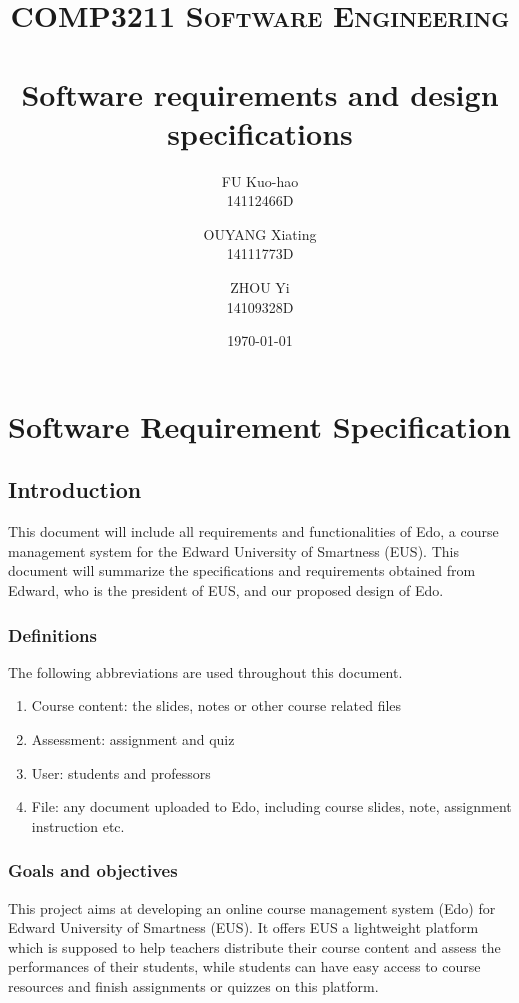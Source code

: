 \documentclass[paper=a4, fontsize=11pt]{scrartcl}
\title{
		\usefont{OT1}{bch}{b}{n}
		\normalfont \normalsize \textsc{COMP3211 Software Engineering} \\ [25pt]
		\horrule{0.5pt} \\[0.4cm]
		\huge Software requirements and design specifications
		\horrule{2pt} \\[0.5cm]
}
\author{
		\normalfont 								
        FU Kuo-hao \\
        14112466D
        \and
        OUYANG Xiating \\
        14111773D
        \and
        ZHOU Yi \\
        14109328D
}
\date{\today}
\numberwithin{equation}{section}		%
\numberwithin{figure}{section}			%
\numberwithin{table}{section}				%
\begin{document}
\begin{titlepage}
\maketitle

\end{titlepage}

\begin{titlepage}
\tableofcontents
\end{titlepage}


\section{Software Requirement Specification}

\subsection{Introduction}
This document will include all requirements and functionalities of Edo, a course management system for the Edward University of Smartness (EUS). This document will summarize the specifications and requirements obtained from Edward, who is the president of EUS, and our proposed design of Edo.

\subsubsection{Definitions}
The following abbreviations are used throughout this document.
\begin{enumerate}
	\item Course content: the slides, notes or other course related files
	\item Assessment: assignment and quiz
	\item User: students and professors
	\item File: any document uploaded to Edo, including course slides, note, assignment instruction etc.
\end{enumerate}

\subsubsection{Goals and objectives}
This project aims at developing an online course management system (Edo) for Edward University of Smartness (EUS). It offers EUS a lightweight platform which is supposed to help teachers distribute their course content and assess the performances of their students, while students can have easy access to course resources and finish assignments or quizzes on this platform.
\end{document}
